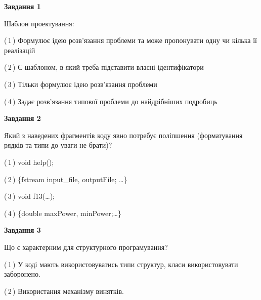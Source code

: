\documentclass[10pt, ukrainian]{article}
\begin{document}
{
\begin {large}
{\begin {center}\textbf{Завдання 1}\end {center}}\par
Шаблон проектування:\par
\vspace{2mm}



(\,1\,) Формулює ідею розв'язання проблеми та може пропонувати одну чи кілька її реалізацій%



(\,2\,) Є шаблоном, в який треба підставити власні ідентифікатори%



(\,3\,) Тільки формулює ідею розв'язання проблеми%



(\,4\,) Задає розв'язання типової проблеми до найдрібніших подробиць%


{\begin {center}\textbf{Завдання 2}\end {center}}\par
Який з наведених фрагментів коду явно потребує поліпшення (форматування рядків та типи до уваги не брати)?\par
\vspace{2mm}



(\,1\,) void help();%



(\,2\,) \{fstream input\_file, outputFile; …\}%



(\,3\,) void f13(…);%



(\,4\,) \{double maxPower, minPower;…\} %


{\begin {center}\textbf{Завдання 3}\end {center}}\par
Що є характерним для структурного програмування?\par
\vspace{2mm}



(\,1\,) У коді мають використовуватись типи структур, класи використовувати заборонено. %



(\,2\,) Використання механізму винятків. %




\end{large}}
\end{document}
